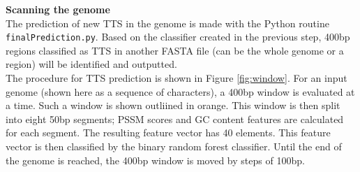\documentclass[12pt,letterpaper]{report}
\begin{document}
{\Large\textbf{Scanning the genome}}\\

The prediction of new TTS in the genome is made with the Python routine\\ \texttt{finalPrediction.py}. Based on the classifier created in the previous step, 400bp regions classified as TTS in another FASTA file (can be the whole genome or a region) will be identified and outputted.\\

The procedure for TTS prediction is shown in Figure \ref{fig:window}. For an input genome (shown here as a sequence of characters), a 400bp window is evaluated at a time. Such a window is shown outliined in orange. This window is then split into eight 50bp segments; PSSM scores and GC content features are calculated for each segment. The resulting feature vector has 40 elements. This feature vector is then classified by the binary random forest classifier. Until the end of the genome is reached, the 400bp window is moved by steps of 100bp.






\nocite{*}

\end{document}
